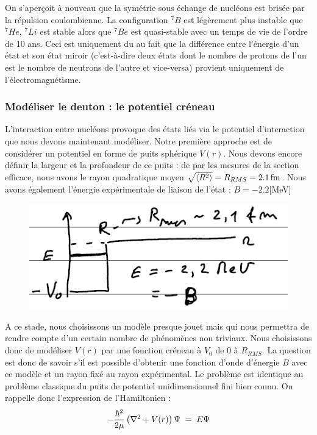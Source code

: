 On s'aperçoit à nouveau que la symétrie sous échange de nucléons est brisée par la répulsion coulombienne. La configuration $^7B$ est légèrement plus instable que $^7He$, $^7Li$ est stable alors que $^7Be$ est quasi-stable avec un temps de vie de l'ordre de 10 ans. Ceci est uniquement du au fait que la différence entre l'énergie d'un état et son état miroir (c'est-à-dire deux états dont le nombre de protons de l'un est le nombre de neutrons de l'autre et vice-versa) provient uniquement de l'électromagnétisme.

\subsubsection{Modéliser le deuton : le potentiel créneau}


L'interaction entre nucléons provoque des états liés via le potentiel d'interaction que nous devons maintenant modéliser. Notre première approche est de considérer un potentiel en forme de puits sphérique $V(r)$. Nous devons encore définir la largeur et la profondeur de ce puits : de par les mesures de la section efficace, nous avons le rayon quadratique moyen $\sqrt{\expval{R^2}} = R_{RMS} = \SI{2.1}{fm}$. Nous avons également l'énergie expérimentale de liaison de l'état : $B = -2.2$[\si{MeV}]
\begin{figure}[H]
    \centering
    \includegraphics[scale=0.8]{Images4/Puits.PNG}
\end{figure}
A ce stade, nous choisissons un modèle presque jouet mais qui nous permettra de rendre compte d'un certain nombre de phénomènes non triviaux. Nous choisissons donc de modéliser $V(r)$ par une fonction créneau à $V_0$ de 0 à $R_{RMS}$. La question est donc de savoir s'il est possible d'obtenir une fonction d'onde d'énergie $B$ avec ce modèle et un rayon fixé au rayon expérimental. Le problème est identique au problème classique du puits de potentiel unidimensionnel fini bien connu. On rappelle donc l'expression de l'Hamiltonien :
\[
    -\dfrac{\hbar^2}{2\mu}\left(\nabla^2 + V(r)\right)\Psi \; = \; E\Psi
\]
